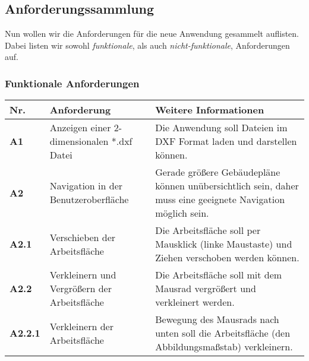 \subsection{Anforderungssammlung}
\label{subsec:requirements}

Nun wollen wir die Anforderungen für die neue Anwendung gesammelt auflisten.
Dabei listen wir sowohl \textit{funktionale}, als auch \textit{nicht-funktionale}, Anforderungen auf.

\vspace{8pt}

\subsubsection{Funktionale Anforderungen}
\label{subsubsec:functional-requirements}

\begin{center}
    \small
    \begin{supertabular}{ p{1cm}|p{3cm}|p{4cm} }
        Nr.             & Anforderung                                   & Weitere Informationen                                                                                                                                                                            \\
        \hline
        \textbf{A1}     & Anzeigen einer 2-dimensionalen *.dxf Datei    & Die Anwendung soll Dateien im DXF Format laden und darstellen können.                                                                                                                            \\
        \textbf{A2}     & Navigation in der Benutzeroberfläche          & Gerade größere Gebäudepläne können unübersichtlich sein, daher muss eine geeignete Navigation möglich sein.                                                                                      \\
        \textbf{A2.1}   & Verschieben der Arbeitsfläche                 & Die Arbeitsfläche soll per Mausklick (linke Maustaste) und Ziehen verschoben werden können.                                                                                                      \\
        \textbf{A2.2}   & Verkleinern und Vergrößern der Arbeitsfläche  & Die Arbeitsfläche soll mit dem Mausrad vergrößert und verkleinert werden.                                                                                                                        \\
        \textbf{A2.2.1} & Verkleinern der Arbeitsfläche                 & Bewegung des Mausrads nach unten soll die Arbeitsfläche (den Abbildungsmaßstab) verkleinern.                                                                                                     \\

\end{supertabular}
\end{center}
